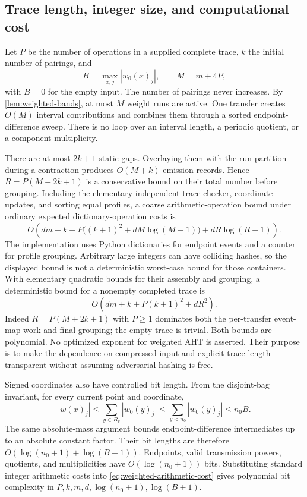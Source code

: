 \subsection{Trace length, integer size, and computational cost}
\label{sec:weighted-complexity}

Let $P$ be the number of operations in a supplied complete trace, $k$ the
initial number of pairings, and
\[
 B=\max_{x,j}|w_0(x)_j|,\qquad M=m+4P,
\]
with $B=0$ for the empty input.
The number of pairings never increases.  By
\cref{lem:weighted-bands}, at most $M$ weight runs are active.  One transfer
creates $O(M)$ interval contributions and combines them through a sorted
endpoint-difference sweep.  There is no loop over an interval length, a
periodic quotient, or a component multiplicity.

There are at most $2k+1$ static gaps.  Overlaying them with the run partition
during a contraction produces $O(M+k)$ emission records.  Hence
$R=P(M+2k+1)$ is a conservative bound on their total number before grouping.
Including the elementary independent trace checker, coordinate updates, and
sorting equal profiles, a coarse arithmetic-operation bound under ordinary
expected dictionary-operation costs is
\begin{equation}
\label{eq:weighted-arithmetic-cost}
 O\!\left(
 dm+k+P\bigl((k+1)^2+dM\log(M+1)\bigr)
       +dR\log(R+1)
 \right).
\end{equation}
The implementation uses Python dictionaries for endpoint events and a
counter for profile grouping.  Arbitrary large integers can have colliding
hashes, so the displayed bound is not a deterministic worst-case bound for
those containers.  With elementary quadratic bounds for their assembly and
grouping, a deterministic bound for a nonempty completed trace is
\[
 O\!\left(dm+k+P(k+1)^2+dR^2\right).
\]
Indeed $R=P(M+2k+1)$ with $P\geq1$ dominates both the per-transfer event-map
work and final grouping; the empty trace is trivial.  Both bounds are
polynomial.  No optimized exponent for weighted AHT is asserted.  Their
purpose is to make the dependence on compressed input and explicit trace
length transparent without assuming adversarial hashing is free.

Signed coordinates also have controlled bit length.  From the disjoint-bag
invariant, for every current point and coordinate,
\begin{equation}
\label{eq:weighted-bit-bound}
 |w(x)_j|
 \leq\sum_{y\in B_x}|w_0(y)_j|
 \leq\sum_{y<n_0}|w_0(y)_j|
 \leq n_0B.
\end{equation}
The same absolute-mass argument bounds endpoint-difference intermediates up
to an absolute constant factor.  Their bit lengths are therefore
$O(\log(n_0+1)+\log(B+1))$.  Endpoints, valid transmission powers, quotients,
and multiplicities have $O(\log(n_0+1))$ bits.  Substituting standard integer
arithmetic costs into \eqref{eq:weighted-arithmetic-cost} gives polynomial bit
complexity in $P,k,m,d,\log(n_0+1),\log(B+1)$.

